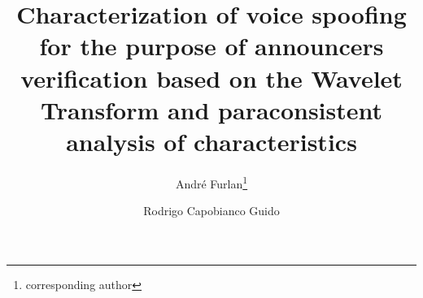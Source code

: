 	\begin{frontmatter}
		\vspace*{-40pt}
		\title{Characterization of voice spoofing for the purpose of announcers verification based on the Wavelet Transform and 
			paraconsistent analysis of characteristics}
				
		\author[a1,a2]{Andr\'{e} Furlan\footnote{corresponding author}}
		\author[a1]{Rodrigo Capobianco Guido}
		\address[a1]{Instituto de Bioci\^{e}ncias, Letras e Ci\^{e}ncias Exatas, Unesp - Univ Estadual Paulista (S\~{a}o Paulo State University), Rua Crist\'{o}v\~{a}o Colombo 2265, Jd Nazareth, 15054-000, S\~{a}o Jos\'{e} do Rio Preto - SP, Brazil.}
		\address[a2]{Centro Paula Souza, São Paulo, SP, Brazil.}
		
		\begin{abstract} 
			
		\end{abstract}
	
		\begin{keyword}
			
		\end{keyword}
	\end{frontmatter}